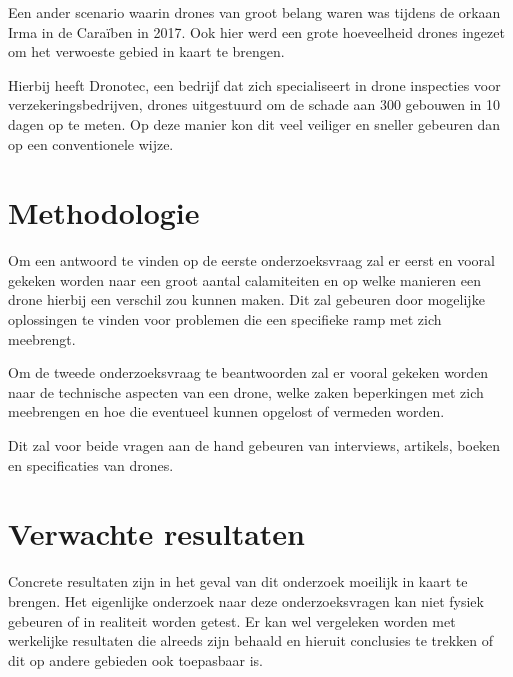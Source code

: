 Een ander scenario waarin drones van groot belang waren was tijdens de orkaan Irma in de Caraïben in 2017. Ook hier werd een grote hoeveelheid drones ingezet om het verwoeste gebied in kaart te brengen. \autocite{Morant}

Hierbij heeft Dronotec, een bedrijf dat zich specialiseert in drone inspecties voor verzekeringsbedrijven, drones uitgestuurd om de schade aan 300 gebouwen in 10 dagen op te meten. Op deze manier kon dit veel veiliger en sneller gebeuren dan op een conventionele wijze.


\section{Methodologie}
\label{sec:methodologie}

Om een antwoord te vinden op de eerste onderzoeksvraag zal er eerst en vooral gekeken worden naar een groot aantal calamiteiten en op welke manieren een drone hierbij een verschil zou kunnen maken. Dit zal gebeuren door mogelijke oplossingen te vinden voor problemen die een specifieke ramp met zich meebrengt. 

Om de tweede onderzoeksvraag te beantwoorden zal er vooral gekeken worden naar de technische aspecten van een drone, welke zaken beperkingen met zich meebrengen en hoe die eventueel kunnen opgelost of vermeden worden.

Dit zal voor beide vragen aan de hand gebeuren van interviews, artikels, boeken en specificaties van drones.

\section{Verwachte resultaten}
\label{sec:verwachte_resultaten}

Concrete resultaten zijn in het geval van dit onderzoek moeilijk in kaart te brengen. Het eigenlijke onderzoek naar deze onderzoeksvragen kan niet fysiek gebeuren of in realiteit worden getest. Er kan wel vergeleken worden met werkelijke resultaten die alreeds zijn behaald en hieruit conclusies te trekken of dit op andere gebieden ook toepasbaar is. 

